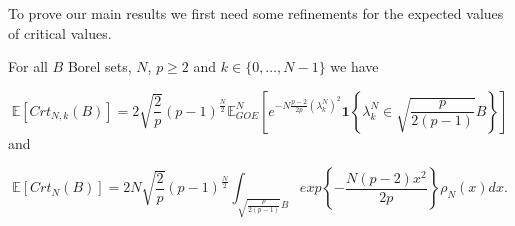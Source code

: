 To prove our main results we first need some refinements for the expected values of critical values.

\begin{theorem}
	For all $B$ Borel sets, $N$, $p\geq 2$ and $k\in\{0,\dots,N-1\}$ we have

	\begin{equation}\label{thm:2.1}
		\mathbb E[Crt_{N,k}(B)]=2\sqrt{\frac{2}{p}}(p-1)^{\frac{N}{2}}\mathbb E_{GOE}^N\left[e^{-N\frac{p-2}{2p}(\lambda_k^N)^2}\bm 1\left\{\lambda_k^N\in\sqrt{\frac{p}{2(p-1)}}B \right\}\right]
	\end{equation} and
	
	\begin{equation}\label{thm:2.2}
		\mathbb E[Crt_N(B)]=2N\sqrt{\frac{2}{p}}(p-1)^{\frac{N}{2}}\int_{\sqrt{\frac{p}{2(p-1)}}B}exp\left\{-\frac{N(p-2)x^2}{2p}\right\}\rho_N(x)dx.
	\end{equation}
\end{theorem}

